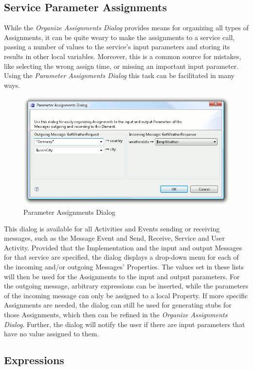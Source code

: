 \subsection{Service Parameter Assignments}

While the \emph{Organize Assignments Dialog} provides means for organizing all
types of Assignments, it can be quite weary to make the assignments to a service
call, passing a number of values to the service's input parameters and storing
its results in other local variables.  Moreover, this is a common source for
mistakes, like selecting the wrong assign time, or missing an important input
parameter.  Using the \emph{Parameter Assignments Dialog} this task can be
facilitated in many ways.

\begin{figure}[ht]
	\centering
	\includegraphics[width=.6\textwidth]{figures/features/paramAssign.png}
	\caption{Parameter Assignments Dialog}
	\label{fig:paramAssign}
\end{figure}

This dialog is available for all Activities and Events sending or receiving
messages, such as the Message Event and Send, Receive, Service and User Activity.
Provided that the Implementation and the input and output Messages for that
service are specified, the dialog displays a drop-down menu for each of the
incoming and/or outgoing Messages' Properties.  The values set in these lists
will then be used for the Assignments to the input and output parameters.  For
the outgoing message, arbitrary expressions can be inserted, while the parameters
of the incoming message can only be assigned to a local Property.  If more specific
Assignments are needed, the dialog can still be used for generating stubs for
those Assignments, which then can be refined in the \emph{Organize Assignments
Dialog}.  Further, the dialog will notify the user if there are input parameters
that have no value assigned to them.



\subsection{Expressions}
\label{sec:user_features_exp}


